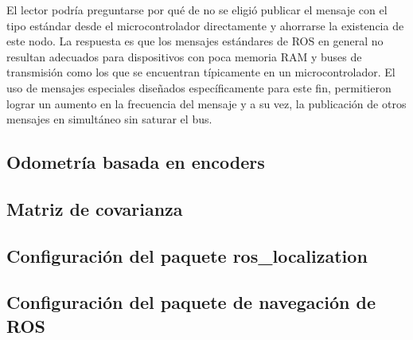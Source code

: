 El lector podría preguntarse por qué de no se eligió publicar el mensaje con el tipo estándar desde el microcontrolador directamente y ahorrarse la existencia de este nodo. La respuesta es que los mensajes estándares de ROS en general no resultan adecuados para dispositivos con poca memoria RAM y buses de transmisión como los que se encuentran típicamente en un microcontrolador. El uso de mensajes especiales diseñados específicamente para este fin, permitieron lograr un aumento en la frecuencia del mensaje y a su vez, la publicación de otros mensajes en simultáneo sin saturar el bus.


\subsection{Odometría basada en encoders}

\subsection{Matriz de covarianza}

\subsection{Configuración del paquete ros\_localization}

\subsection{Configuración del paquete de navegación de ROS}